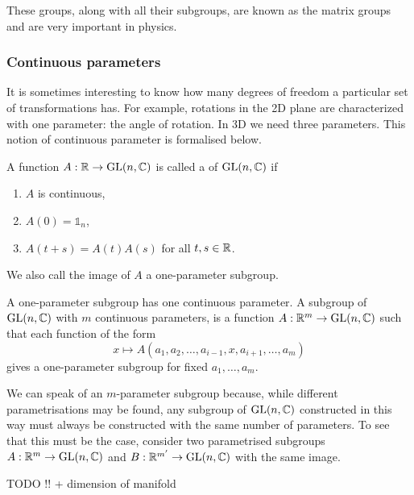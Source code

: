 These groups, along with all their subgroups, are known as the matrix groups and are very important in physics.

\subsubsection{Continuous parameters}
It is sometimes interesting to know how many degrees of freedom a particular set of transformations has. For example, rotations in the 2D plane are characterized with one parameter: the angle of rotation. In 3D we need three parameters. This notion of continuous parameter is formalised below.

\begin{definition}
A function $A : \mathbb{R} \to \operatorname{GL}(n, \mathbb{C})$ is called a  of $\operatorname{GL}(n, \mathbb{C})$ if
\begin{enumerate}
\item $A$ is continuous,
\item $A(0) = \mathbb{1}_n$,
\item $A(t+s) = A(t)A(s)$ for all $t,s \in \mathbb{R}$.
\end{enumerate}
We also call the image of $A$ a one-parameter subgroup.
\end{definition}

A one-parameter subgroup has one continuous parameter. A subgroup of $\operatorname{GL}(n, \mathbb{C})$ with $m$ continuous parameters, is a function $A : \mathbb{R}^m \to \operatorname{GL}(n, \mathbb{C})$ such that each function of the form
\[ x \mapsto A(a_1, a_2, \ldots , a_{i-1}, x, a_{i+1}, \ldots, a_m) \]
gives a one-parameter subgroup for fixed $a_1,\ldots, a_m$.

We can speak of an $m$-parameter subgroup because, while different parametrisations may be found, any subgroup of $\operatorname{GL}(n,\mathbb{C})$ constructed in this way must always be constructed with the same number of parameters. To see that this must be the case, consider two parametrised subgroups $A : \mathbb{R}^m \to \operatorname{GL}(n, \mathbb{C})$ and $B : \mathbb{R}^{m'} \to \operatorname{GL}(n, \mathbb{C})$ with the same image.

TODO !! + dimension of manifold

